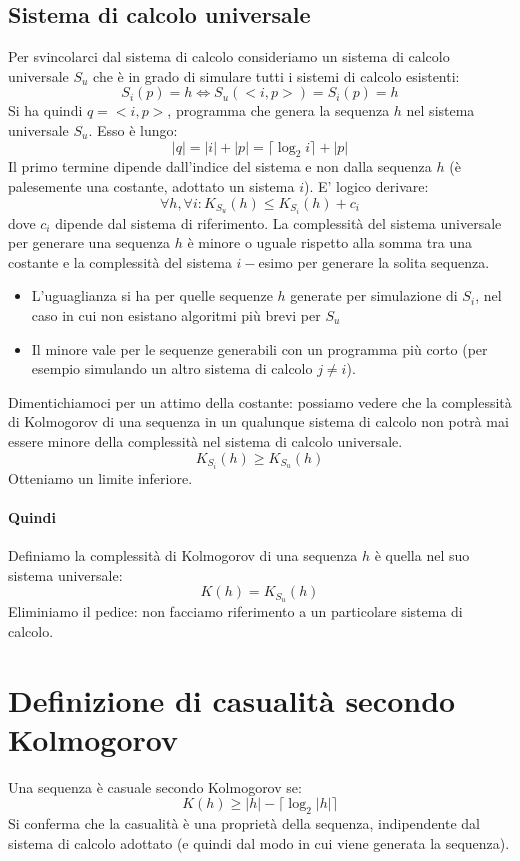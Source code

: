 \subsection{Sistema di calcolo universale}
Per svincolarci dal sistema di calcolo consideriamo un sistema di calcolo universale $S_u$ che è in grado di simulare tutti i sistemi di calcolo esistenti:
$$
    S_i(p) = h \iff S_u(<i, p>) = S_i(p) = h
$$
Si ha quindi $q=<i,p>$, programma che genera la sequenza $h$ nel sistema universale $S_u$. Esso è lungo:
$$
    |q| = |i| + |p| = \lceil\log_2i\rceil + |p|
$$ 
Il primo termine dipende dall'indice del sistema e non dalla sequenza $h$ (è palesemente una costante, adottato un sistema $i$). E' logico derivare:
$$
    \forall h, \forall i : K_{S_u}(h) \leq K_{S_i}(h) + c_i
$$ 
dove $c_i$ dipende dal sistema di riferimento. La complessità del sistema universale per generare una sequenza $h$ è minore o uguale rispetto alla somma tra una costante e la {complessità del sistema $i-$esimo} per generare la solita sequenza.
\begin{itemize}
    \item L'uguaglianza si ha per quelle sequenze $h$ generate per simulazione di $S_i$, nel caso in cui non esistano algoritmi più brevi per $S_u$
    \item Il minore vale per le sequenze generabili con un programma più corto (per esempio simulando un altro sistema di calcolo $j \neq i$).
\end{itemize}
Dimentichiamoci per un attimo della costante: possiamo vedere che la complessità di Kolmogorov di una sequenza in un qualunque sistema di calcolo non potrà mai essere minore della complessità nel sistema di calcolo universale.
\[K_{S_i}(h) \geq K_{S_u}(h)\] Otteniamo un limite inferiore.

\paragraph{Quindi} Definiamo la complessità di Kolmogorov di una sequenza $h$ è quella nel suo sistema universale:
$$
    K(h) = K_{S_u}(h)
$$
Eliminiamo il pedice: non facciamo riferimento a un particolare sistema di calcolo.

\section{Definizione di casualità secondo Kolmogorov}
Una sequenza è casuale secondo Kolmogorov se:
$$
    K(h) \geq |h| - \lceil{\log_2|h|}\rceil
$$
Si conferma che la casualità è una proprietà della sequenza, indipendente dal sistema di calcolo adottato (e quindi dal modo in cui viene generata la sequenza).


